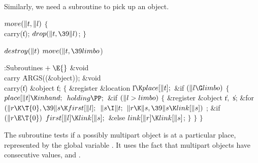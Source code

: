 Similarly, we need a subroutine to pick up an object.

\Y\B\4\D$\\{move}(\|t,\|l)$ \5
${}\{{}$\5
\1\\{carry}(\|t);\5
${}\\{drop}(\|t,\39\|l){}$;\5
${}\}{}$\2\par
\B\4\D$\\{destroy}(\|t)$ \5
$\\{move}(\|t,\39\\{limbo}{}$)\par
\Y\B\4:Subroutines\X${}\mathrel+\E{}$\6
\&{void} \\{carry}\,\,\.{ARGS}((\&{object}));\7
\&{void} \\{carry}(\|t)\1\1\6
\&{object} \|t;\2\2\6
${}\{{}$\5
\1\&{register} \&{location} \|l${}\K\\{place}[\|t];{}$\7
\&{if} ${}(\|l\G\\{limbo}){}$\5
${}\{{}$\1\6
${}\\{place}[\|t]\K\\{inhand};{}$\6
${}\\{holding}\PP;{}$\6
\&{if} ${}(\|l>\\{limbo}){}$\5
${}\{{}$\1\6
\&{register} \&{object} \|r${},{}$ \|s;\7
\&{for} ${}(\|r\K\T{0},\39\|s\K\\{first}[\|l];{}$ ${}\|s\I\|t;{}$ ${}\|r\K\|s,%
\39\|s\K\\{link}[\|s]){}$\1\5
;\2\6
\&{if} ${}(\|r\E\T{0}){}$\1\5
${}\\{first}[\|l]\K\\{link}[\|s];{}$\2\6
\&{else}\1\5
${}\\{link}[\|r]\K\\{link}[\|s]{}$;\2\6
\4${}\}{}$\2\6
\4${}\}{}$\2\6
\4${}\}{}$\2\par
\fi

The  subroutine tests if a possibly multipart object
is
at a particular place, represented by the global variable .
It uses the fact that multipart objects
have consecutive values, and .

